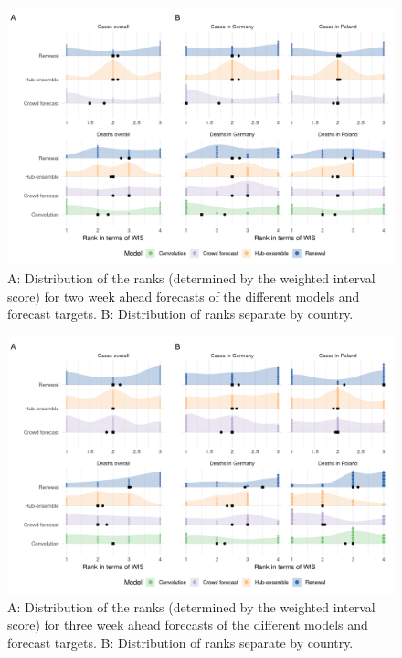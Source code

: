 \documentclass[
]{article}
\begin{document}
\begin{figure}[H]
\includegraphics[width=1\linewidth,]{../analysis/plots/distribution_scores_wis-2-ranks} \caption{A: Distribution of the ranks (determined by the weighted interval score) for two week ahead forecasts of the different models and forecast targets. B: Distribution of ranks separate by country.}\label{fig:distribution-scores-ranks-2}
\end{figure}

\begin{figure}[H]
\includegraphics[width=1\linewidth,]{../analysis/plots/distribution_scores_wis-3-ranks} \caption{A: Distribution of the ranks (determined by the weighted interval score) for three week ahead forecasts of the different models and forecast targets. B: Distribution of ranks separate by country.}\label{fig:distribution-scores-ranks-3}
\end{figure}
\end{document}
